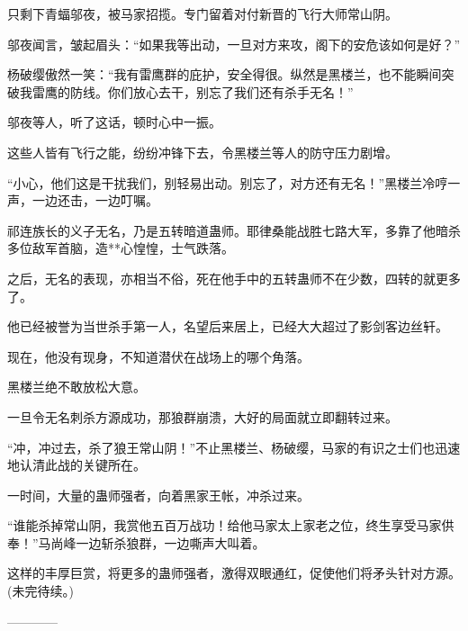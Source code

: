 \begin{this_body}
只剩下青蝠邬夜，被马家招揽。专门留着对付新晋的飞行大师常山阴。

邬夜闻言，皱起眉头：“如果我等出动，一旦对方来攻，阁下的安危该如何是好？”

杨破缨傲然一笑：“我有雷鹰群的庇护，安全得很。纵然是黑楼兰，也不能瞬间突破我雷鹰的防线。你们放心去干，别忘了我们还有杀手无名！”

邬夜等人，听了这话，顿时心中一振。

这些人皆有飞行之能，纷纷冲锋下去，令黑楼兰等人的防守压力剧增。

“小心，他们这是干扰我们，别轻易出动。别忘了，对方还有无名！”黑楼兰冷哼一声，一边还击，一边叮嘱。

祁连族长的义子无名，乃是五转暗道蛊师。耶律桑能战胜七路大军，多靠了他暗杀多位敌军首脑，造**心惶惶，士气跌落。

之后，无名的表现，亦相当不俗，死在他手中的五转蛊师不在少数，四转的就更多了。

他已经被誉为当世杀手第一人，名望后来居上，已经大大超过了影剑客边丝轩。

现在，他没有现身，不知道潜伏在战场上的哪个角落。

黑楼兰绝不敢放松大意。

一旦令无名刺杀方源成功，那狼群崩溃，大好的局面就立即翻转过来。

“冲，冲过去，杀了狼王常山阴！”不止黑楼兰、杨破缨，马家的有识之士们也迅速地认清此战的关键所在。

一时间，大量的蛊师强者，向着黑家王帐，冲杀过来。

“谁能杀掉常山阴，我赏他五百万战功！给他马家太上家老之位，终生享受马家供奉！”马尚峰一边斩杀狼群，一边嘶声大叫着。

这样的丰厚巨赏，将更多的蛊师强者，激得双眼通红，促使他们将矛头针对方源。(未完待续。)

------------

\end{this_body}


